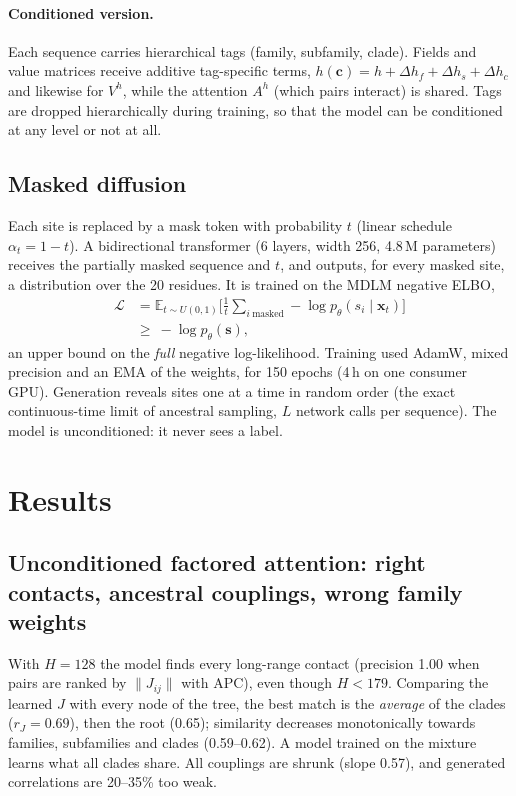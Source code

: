\documentclass[10pt,a4paper,twocolumn]{article}
\newcommand{\E}{\mathbb{E}}
\begin{document}
\paragraph{Conditioned version.} Each sequence carries hierarchical tags (family, subfamily, clade). Fields and value
matrices receive additive tag-specific terms, $h(\bm c)=h+\Delta h_f+\Delta h_s+\Delta h_c$ and likewise for $V^h$,
while the attention $A^h$ (which pairs interact) is shared. Tags are dropped hierarchically during training, so that
the model can be conditioned at any level or not at all.

\subsection{Masked diffusion}
Each site is replaced by a mask token with probability $t$ (linear schedule $\alpha_t=1-t$). A bidirectional
transformer (6 layers, width 256, 4.8\,M parameters) receives the partially masked sequence and $t$, and outputs, for
every masked site, a distribution over the 20 residues. It is trained on the MDLM negative ELBO,
\begin{align*}
\mathcal L&=\E_{t\sim U(0,1)}\Big[\frac1t\sum_{i\ \text{masked}}-\log p_\theta(s_i\mid\bm x_t)\Big]\\
&\ge\ -\log p_\theta(\bm s),
\end{align*}
an upper bound on the \emph{full} negative log-likelihood. Training used AdamW, mixed precision and an EMA of the
weights, for 150 epochs (4\,h on one consumer GPU). Generation reveals sites one at a time in random order (the exact
continuous-time limit of ancestral sampling, $L$ network calls per sequence). The model is unconditioned: it never
sees a label.

\section{Results}
\subsection{Unconditioned factored attention: right contacts, ancestral couplings, wrong family weights}
With $H=128$ the model finds every long-range contact (precision 1.00 when pairs are ranked by $\|J_{ij}\|$ with APC),
even though $H<179$. Comparing the learned $J$ with every node of the tree, the best match is the \emph{average} of the
clades ($r_J=0.69$), then the root (0.65); similarity decreases monotonically towards families, subfamilies and
clades (0.59--0.62). A model trained on the mixture learns what all clades share. All couplings are shrunk (slope 0.57),
and generated correlations are 20--35\% too weak.
\end{document}
